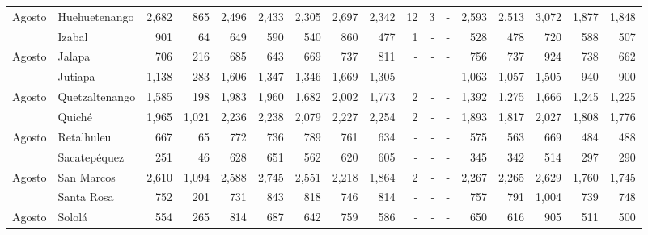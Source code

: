 \begin{landscape}
\begin{center}
\begin{longtable}{llrrrrrrrrrrrrrrr}
			\multicolumn{1}{l}{	\footnotesize	 Agosto 	}&	 Huehuetenango 	&	 2,682 	&	 865 	&	 2,496 	&	 2,433 	&	 2,305 	&	 2,697 	&	 2,342 	&	 12 	&	 3 	&	 -   	&	 2,593 	&	 2,513 	&	 3,072 	&	 1,877 	&	 1,848 	\\
			\rowcolor{color1!5!white}\multicolumn{1}{l}{	\footnotesize	 Agosto 	}&	 Izabal 	&	 901 	&	 64 	&	 649 	&	 590 	&	 540 	&	 860 	&	 477 	&	 1 	&	 -   	&	 -   	&	 528 	&	 478 	&	 720 	&	 588 	&	 507 	\\
			\multicolumn{1}{l}{	\footnotesize	 Agosto 	}&	 Jalapa 	&	 706 	&	 216 	&	 685 	&	 643 	&	 669 	&	 737 	&	 811 	&	 -   	&	 -   	&	 -   	&	 756 	&	 737 	&	 924 	&	 738 	&	 662 	\\
			\rowcolor{color1!5!white}\multicolumn{1}{l}{	\footnotesize	 Agosto 	}&	 Jutiapa 	&	 1,138 	&	 283 	&	 1,606 	&	 1,347 	&	 1,346 	&	 1,669 	&	 1,305 	&	 -   	&	 -   	&	 -   	&	 1,063 	&	 1,057 	&	 1,505 	&	 940 	&	 900 	\\
			\multicolumn{1}{l}{	\footnotesize	 Agosto 	}&	 Quetzaltenango 	&	 1,585 	&	 198 	&	 1,983 	&	 1,960 	&	 1,682 	&	 2,002 	&	 1,773 	&	 2 	&	 -   	&	 -   	&	 1,392 	&	 1,275 	&	 1,666 	&	 1,245 	&	 1,225 	\\
			\rowcolor{color1!5!white}\multicolumn{1}{l}{	\footnotesize	 Agosto 	}&	 Quiché 	&	 1,965 	&	 1,021 	&	 2,236 	&	 2,238 	&	 2,079 	&	 2,227 	&	 2,254 	&	 2 	&	 -   	&	 -   	&	 1,893 	&	 1,817 	&	 2,027 	&	 1,808 	&	 1,776 	\\
			\multicolumn{1}{l}{	\footnotesize	 Agosto 	}&	 Retalhuleu 	&	 667 	&	 65 	&	 772 	&	 736 	&	 789 	&	 761 	&	 634 	&	 -   	&	 -   	&	 -   	&	 575 	&	 563 	&	 669 	&	 484 	&	 488 	\\
			\rowcolor{color1!5!white}\multicolumn{1}{l}{	\footnotesize	 Agosto 	}&	 Sacatepéquez 	&	 251 	&	 46 	&	 628 	&	 651 	&	 562 	&	 620 	&	 605 	&	 -   	&	 -   	&	 -   	&	 345 	&	 342 	&	 514 	&	 297 	&	 290 	\\
			\multicolumn{1}{l}{	\footnotesize	 Agosto 	}&	 San Marcos 	&	 2,610 	&	 1,094 	&	 2,588 	&	 2,745 	&	 2,551 	&	 2,218 	&	 1,864 	&	 2 	&	 -   	&	 -   	&	 2,267 	&	 2,265 	&	 2,629 	&	 1,760 	&	 1,745 	\\
			\rowcolor{color1!5!white}\multicolumn{1}{l}{	\footnotesize	 Agosto 	}&	 Santa Rosa 	&	 752 	&	 201 	&	 731 	&	 843 	&	 818 	&	 746 	&	 814 	&	 -   	&	 -   	&	 -   	&	 757 	&	 791 	&	 1,004 	&	 739 	&	 748 	\\
			\multicolumn{1}{l}{	\footnotesize	 Agosto 	}&	 Sololá 	&	 554 	&	 265 	&	 814 	&	 687 	&	 642 	&	 759 	&	 586 	&	 -   	&	 -   	&	 -   	&	 650 	&	 616 	&	 905 	&	 511 	&	 500 	\\

\end{longtable}
\end{center}
\end{landscape}
